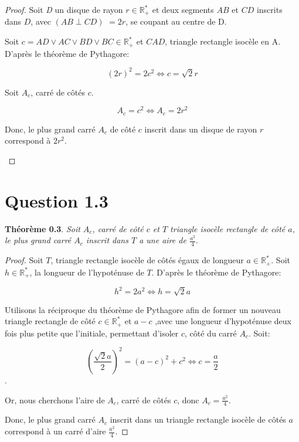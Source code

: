 \documentclass[]{amsart}
\theoremstyle{definition}
\theoremstyle{remark}
\numberwithin{equation}{section}
\begin{document}
\begin{proof}
Soit \emph{D} un disque de rayon $r \in \mathbb{R_{+}^{\ast}}$ et deux segments $AB$ et $CD$ inscrits dans $D$, avec $(AB \perp CD)$ $=2r$, se coupant au centre de D.

Soit $c = AD\vee AC\vee BD\vee BC \in \mathbb{R_{+}^{\ast}}$ et $CAD$, triangle rectangle isocèle en A. D'après le théorème de Pythagore:

\[(2r)^2=2c^2 \Leftrightarrow c = \sqrt{2}r\]

Soit $A_c$, carré de côtés $c$. 

\[A_c = c^2 \Leftrightarrow A_c = 2r^2\]

Donc, le plus grand carré $A_c$ de côté $c$ inscrit dans un disque de rayon $r$ correspond à $2r^2$.


\begin{center}
\end{center}
\end{proof}

\section*{Question 1.3}
\textbf{Théorème 0.3}. \emph{Soit $A_c$, carré de côté $c$ et $T$ triangle isocèle rectangle de côté $a$, le plus grand carré $A_c$ inscrit dans $T$ a une aire de $\frac{a^2}{4}$}.

\begin{proof}
Soit $T$, triangle rectangle isocèle de côtés égaux de longueur $a \in \mathbb{R_{+}^{\ast}}$. Soit $h \in \mathbb{R_{+}^{\ast}}$, la longueur de l'hypoténuse de $T$. D'après le théorème de Pythagore:

\[h^2=2a^2 \Leftrightarrow h=\sqrt{2}a\]

Utilisons la réciproque du théorème de Pythagore afin  de former un nouveau triangle rectangle de côté $c \in \mathbb{R_{+}^{\ast}}$ et $a-c$ ,avec une longueur d'hypoténuse deux fois plus petite que l'initiale, permettant d'isoler $c$, côté du carré $A_c$. Soit:

\[(\frac{\sqrt{2}a}{2})^2 = (a-c)^2+c^2 \Leftrightarrow c = \frac{a}{2}\].

Or, nous cherchons l'aire de $A_c$, carré de côtés $c$, donc $A_c = \frac{a^2}{4}$.\newline

Donc, le plus grand carré $A_c$ inscrit dans un triangle rectangle isocèle de côtés $a$ correspond à un carré d'aire $\frac{a^2}{4}$.
\end{proof}
\end{document}

